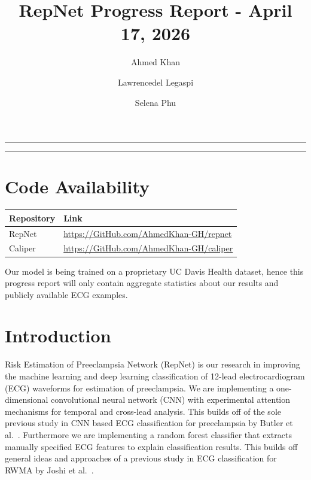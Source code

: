 \documentclass[sigconf,nonacm]{acmart}
\begin{document}
\title{RepNet Progress Report - April 17, 2026}

\author{Ahmed Khan}

\author{Lawrencedel Legaspi}

\author{Selena Phu}

\maketitle

{%
\renewcommand{\contentsname}{Table of Contents}
\setcounter{tocdepth}{2}
\begin{strip}
\hrule\vspace{6pt}
\tableofcontents
\vspace{6pt}\hrule
\end{strip}
}

\section*{Code Availability}
\begin{center}
\begin{tabular}{@{}ll@{}}
\toprule
\textbf{Repository} & \textbf{Link} \\
\midrule
RepNet & \url{https://GitHub.com/AhmedKhan-GH/repnet} \\
Caliper & \url{https://GitHub.com/AhmedKhan-GH/caliper} \\
\bottomrule
\end{tabular}
\end{center}

Our model is being trained on a proprietary UC Davis Health dataset, hence this progress report will only contain aggregate statistics about our results and publicly available ECG examples.

\section{Introduction}
Risk Estimation of Preeclampsia Network (RepNet) is our research in improving the machine learning and deep learning classification of 12-lead electrocardiogram (ECG) waveforms for estimation of preeclampsia. We are implementing a one-dimensional convolutional neural network (CNN) with experimental attention mechanisms for temporal and cross-lead analysis. This builds off of the sole previous study in CNN based ECG classification for preeclampsia by Butler et al.\ \cite{butler_ai-based_2024}. Furthermore we are implementing a random forest classifier that extracts manually specified ECG features to explain classification results. This builds off general ideas and approaches of a previous study in ECG classification for RWMA by Joshi et al.\ \cite{joshi_linking_2025}.
\end{document}
